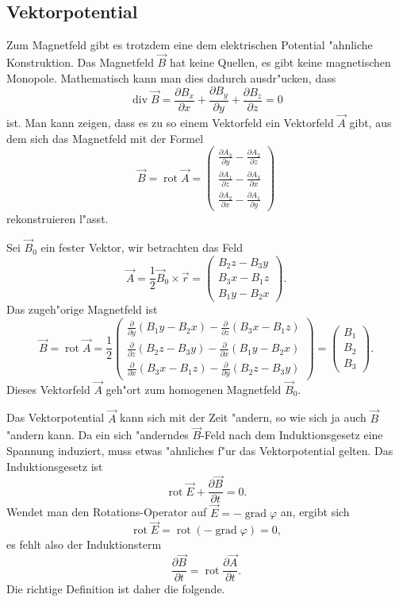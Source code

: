 \subsection{Vektorpotential}
Zum Magnetfeld gibt es trotzdem eine dem elektrischen Potential
"ahnliche Konstruktion.
Das Magnetfeld $\vec B$ hat keine Quellen, es gibt keine magnetischen
Monopole.
Mathematisch kann man dies dadurch ausdr"ucken, dass 
\[
\operatorname{div}\vec B
=
\frac{\partial B_x}{\partial x}
+
\frac{\partial B_y}{\partial y}
+
\frac{\partial B_z}{\partial z}
=0
\]
ist.
Man kann zeigen, dass es zu so einem Vektorfeld ein Vektorfeld $\vec A$
gibt, aus dem sich das Magnetfeld mit der Formel
\[
\vec B=\operatorname{rot}\vec A
=\begin{pmatrix}
\frac{\partial A_3}{\partial y}-\frac{\partial A_2}{\partial z}\\
\frac{\partial A_1}{\partial z}-\frac{\partial A_3}{\partial x}\\
\frac{\partial A_2}{\partial x}-\frac{\partial A_1}{\partial y}
\end{pmatrix}
\]
rekonstruieren l"asst.

\begin{beispiel}
Sei $\vec B_0$ ein fester Vektor, wir betrachten das Feld
\[
\vec A=\frac12\vec B_0\times \vec r=\begin{pmatrix}
B_2z-B_3y\\
B_3x-B_1z\\
B_1y-B_2x
\end{pmatrix}.
\]
Das zugeh"orige Magnetfeld ist
\begin{equation}
\vec B
=
\operatorname{rot}\vec A
=
\frac12
\begin{pmatrix}
\frac{\partial}{\partial y}(B_1y-B_2x)-\frac{\partial}{\partial z}(B_3x-B_1z)\\
\frac{\partial}{\partial z}(B_2z-B_3y)-\frac{\partial}{\partial x}(B_1y-B_2x)\\
\frac{\partial}{\partial x}(B_3x-B_1z)-\frac{\partial}{\partial y}(B_2z-B_3y)
\end{pmatrix}
=
\begin{pmatrix}
B_1\\B_2\\B_3
\end{pmatrix}.
\end{equation}
Dieses Vektorfeld $\vec A$ geh"ort zum homogenen Magnetfeld $\vec B_0$.
\end{beispiel}

Das Vektorpotential $\vec A$ kann sich mit der Zeit "andern, so wie sich
ja auch $\vec B$ "andern kann.
Da ein sich "anderndes $\vec B$-Feld nach dem Induktionsgesetz eine
Spannung induziert, muss etwas "ahnliches f"ur das Vektorpotential gelten.
Das Induktionsgesetz ist
\[
\operatorname{rot}\vec E +\frac{\partial\vec B}{\partial t}=0.
\]
Wendet man den Rotations-Operator auf
$\vec E = -\operatorname{grad}\varphi$ an, ergibt sich
\[
\operatorname{rot}\vec E=\operatorname{rot}(-\operatorname{grad}\varphi)=0,
\]
es fehlt also der Induktionsterm
\[
\frac{\partial\vec B}{\partial t}
=
\operatorname{rot}\frac{\partial\vec A}{\partial t}.
\]
Die richtige Definition ist daher die folgende.


